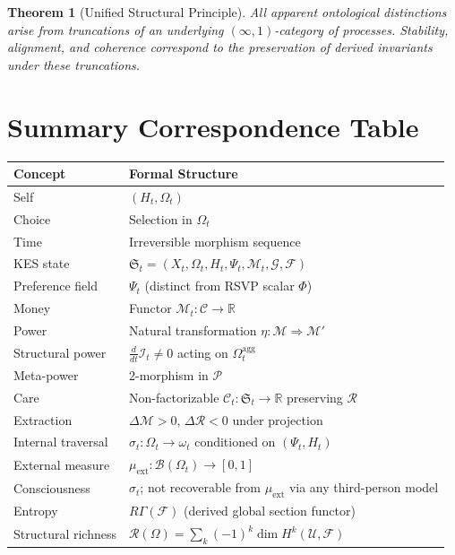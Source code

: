 \documentclass[11pt,a4paper]{article}
\newtheorem{theorem}{Theorem}[section]
\theoremstyle{definition}
\theoremstyle{remark}
\begin{document}
\begin{theorem}[Unified Structural Principle]
All apparent ontological distinctions arise from truncations of an underlying $(\infty,1)$-category of processes. Stability, alignment, and coherence correspond to the preservation of derived invariants under these truncations.
\end{theorem}

\section{Summary Correspondence Table}

\begin{center}
\begin{tabular}{ll}
\toprule
Concept & Formal Structure \\
\midrule
Self & $(H_t, \Omega_t)$ \\
Choice & Selection in $\Omega_t$ \\
Time & Irreversible morphism sequence \\
KES state & $\mathfrak{S}_t = (X_t, \Omega_t, H_t, \Psi_t, \mathcal{M}_t, \mathcal{G}, \mathcal{F})$ \\
Preference field & $\Psi_t$ (distinct from RSVP scalar $\Phi$) \\
Money & Functor $\mathcal{M}_t : \mathcal{C} \to \mathbb{R}$ \\
Power & Natural transformation $\eta : \mathcal{M} \Rightarrow \mathcal{M}'$ \\
Structural power & $\tfrac{d}{dt}\mathcal{I}_t \neq 0$ acting on $\Omega_t^{\mathrm{agg}}$ \\
Meta-power & 2-morphism in $\mathcal{P}$ \\
Care & Non-factorizable $\mathcal{C}_t : \mathfrak{S}_t \to \mathbb{R}$ preserving $\mathcal{R}$ \\
Extraction & $\Delta\mathcal{M} > 0$, $\Delta\mathcal{R} < 0$ under projection \\
Internal traversal & $\sigma_t : \Omega_t \to \omega_t$ conditioned on $(\Psi_t, H_t)$ \\
External measure & $\mu_{\mathrm{ext}} : \mathcal{B}(\Omega_t) \to [0,1]$ \\
Consciousness & $\sigma_t$; not recoverable from $\mu_{\mathrm{ext}}$ via any third-person model \\
Entropy & $R\Gamma(\mathcal{F})$ (derived global section functor) \\
Structural richness & $\mathcal{R}(\Omega) = \sum_k (-1)^k \dim H^k(\mathcal{U}, \mathcal{F})$ \\
\bottomrule
\end{tabular}
\end{center}
\end{document}
